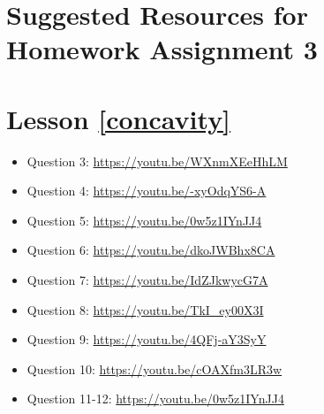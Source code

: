 \section*{Suggested Resources for Homework Assignment 3}
\section*{Lesson \ref{concavity}}
\begin{itemize}[leftmargin=*]
    \item Question 3: \url{https://youtu.be/WXnmXEeHhLM} 
    \item Question 4: \url{https://youtu.be/-xyOdqYS6-A}
    \item Question 5: \url{https://youtu.be/0w5z1IYnJJ4}
    \item Question 6: \url{https://youtu.be/dkoJWBhx8CA}
    \item Question 7: \url{https://youtu.be/IdZJkwycG7A}
    \item Question 8: \url{https://youtu.be/TkI_ey00X3I}
    \item Question 9: \url{https://youtu.be/4QFj-aY3SyY}
    \item Question 10: \url{https://youtu.be/cOAXfm3LR3w}
    \item Question 11-12: \url{https://youtu.be/0w5z1IYnJJ4}
   
\end{itemize}


